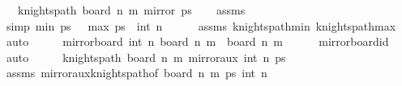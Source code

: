 \begin{isabellebody}
\ \ \ {\isachardoublequoteopen}knights{\isacharunderscore}{\kern0pt}path\ {\isacharparenleft}{\kern0pt}board\ n\ m{\isacharparenright}{\kern0pt}\ {\isacharparenleft}{\kern0pt}mirror{}\ ps{\isacharparenright}{\kern0pt}{\isachardoublequoteclose}\isanewline
%
\isadelimproof
\ \ %
\endisadelimproof
%
\isatagproof
{}\isamarkupfalse%
\ assms\isanewline
{}\isamarkupfalse%
\ {\isacharminus}{\kern0pt}\isanewline
\ \ \isamarkupfalse%
\ {\isacharbrackleft}{\kern0pt}simp{\isacharbrackright}{\kern0pt}{\isacharcolon}{\kern0pt}\ {\isachardoublequoteopen}min{}\ ps\ {\isacharequal}{\kern0pt}\ {}{\isachardoublequoteclose}\ {\isachardoublequoteopen}max{}\ ps\ {\isacharequal}{\kern0pt}\ int\ n{\isachardoublequoteclose}\isanewline
\ \ \ \ \isamarkupfalse%
\ assms\ knights{\isacharunderscore}{\kern0pt}path{\isacharunderscore}{\kern0pt}min{}\ knights{\isacharunderscore}{\kern0pt}path{\isacharunderscore}{\kern0pt}max{}\ \isamarkupfalse%
\ auto\isanewline
\ \ \isamarkupfalse%
\ \isamarkupfalse%
\ {\isachardoublequoteopen}mirror{}{\isacharunderscore}{\kern0pt}board\ {\isacharparenleft}{\kern0pt}int\ n{\isacharplus}{\kern0pt}{}{\isacharparenright}{\kern0pt}\ {\isacharparenleft}{\kern0pt}board\ n\ m{\isacharparenright}{\kern0pt}\ {\isacharequal}{\kern0pt}\ {\isacharparenleft}{\kern0pt}board\ n\ m{\isacharparenright}{\kern0pt}{\isachardoublequoteclose}\isanewline
\ \ \ \ \isamarkupfalse%
\ mirror{}{\isacharunderscore}{\kern0pt}board{\isacharunderscore}{\kern0pt}id\ \isamarkupfalse%
\ auto\isanewline
\ \ \isamarkupfalse%
\ \isamarkupfalse%
\ {\isachardoublequoteopen}knights{\isacharunderscore}{\kern0pt}path\ {\isacharparenleft}{\kern0pt}board\ n\ m{\isacharparenright}{\kern0pt}\ {\isacharparenleft}{\kern0pt}mirror{}{\isacharunderscore}{\kern0pt}aux\ {\isacharparenleft}{\kern0pt}int\ n{\isacharplus}{\kern0pt}{}{\isacharparenright}{\kern0pt}\ ps{\isacharparenright}{\kern0pt}{\isachardoublequoteclose}\isanewline
\ \ \ \ \isamarkupfalse%
\ assms\ mirror{}{\isacharunderscore}{\kern0pt}aux{\isacharunderscore}{\kern0pt}knights{\isacharunderscore}{\kern0pt}path{\isacharbrackleft}{\kern0pt}of\ {\isachardoublequoteopen}board\ n\ m{\isachardoublequoteclose}\ ps\ {\isachardoublequoteopen}int\ n{\isacharplus}{\kern0pt}{}{\isachardoublequoteclose}{\isacharbrackright}{\kern0pt}\ \isamarkupfalse%

\end{isabellebody}
